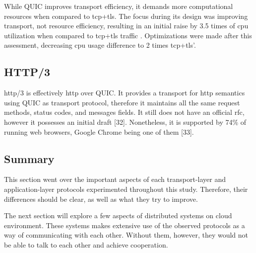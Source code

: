 While QUIC improves transport efficiency, it demands more computational resources when compared to \gls{tcp}+\gls{tls}. The focus during its design was improving transport, not resource efficiency, resulting in an initial raise by 3.5 times of \gls{cpu} utilization when compared to \gls{tcp}+\gls{tls} traffic \cite{quic_protocol}. Optimizations were made after this assessment, decreasing \gls{cpu} usage difference to 2 times \gls{tcp}+\gls{tls}’.

\subsection{HTTP/3}

\gls{http}/3 is effectively \gls{http} over QUIC. It provides a transport for \gls{http} semantics using QUIC as transport protocol, therefore it maintains all the same request methods, status codes, and messages fields. It still does not have an official \gls{rfc}, however it possesses an initial draft [32]. Nonetheless, it is supported by 74\% of running web browsers, Google Chrome being one of them [33].

\subsection{Summary}

This section went over the important aspects of each transport-layer and application-layer protocols experimented throughout this study. Therefore, their differences should be clear, as well as what they try to improve.

The next section will explore a few aspects of distributed systems on cloud environment. These systems makes extensive use of the observed protocols as a way of communicating with each other. Without them, however, they would not be able to talk to each other and achieve cooperation.
